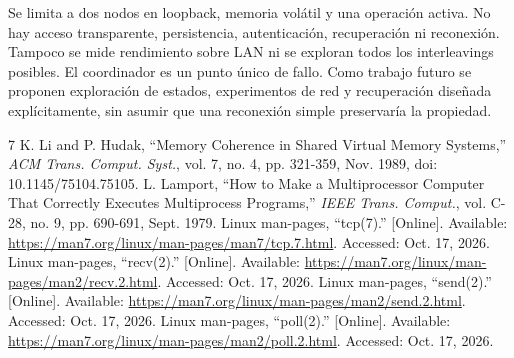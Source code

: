 \documentclass[conference]{IEEEtran}
\begin{document}
Se limita a dos nodos en loopback, memoria volátil y una operación activa. No hay
acceso transparente, persistencia, autenticación, recuperación ni reconexión. Tampoco
se mide rendimiento sobre LAN ni se exploran todos los interleavings posibles. El
coordinador es un punto único de fallo. Como trabajo futuro se proponen exploración
de estados, experimentos de red y recuperación diseñada explícitamente, sin asumir
que una reconexión simple preservaría la propiedad.

\begin{thebibliography}{7}
 K. Li and P. Hudak, ``Memory Coherence in Shared Virtual Memory Systems,''
\emph{ACM Trans. Comput. Syst.}, vol. 7, no. 4, pp. 321-359, Nov. 1989,
doi: 10.1145/75104.75105.
 L. Lamport, ``How to Make a Multiprocessor Computer That Correctly
Executes Multiprocess Programs,'' \emph{IEEE Trans. Comput.}, vol. C-28, no. 9,
pp. 690-691, Sept. 1979.
 Linux man-pages, ``tcp(7).'' [Online]. Available:
\url{https://man7.org/linux/man-pages/man7/tcp.7.html}. Accessed: Oct. 17, 2026.
 Linux man-pages, ``recv(2).'' [Online]. Available:
\url{https://man7.org/linux/man-pages/man2/recv.2.html}. Accessed: Oct. 17, 2026.
 Linux man-pages, ``send(2).'' [Online]. Available:
\url{https://man7.org/linux/man-pages/man2/send.2.html}. Accessed: Oct. 17, 2026.
 Linux man-pages, ``poll(2).'' [Online]. Available:
\url{https://man7.org/linux/man-pages/man2/poll.2.html}. Accessed: Oct. 17, 2026.
\end{thebibliography}
\end{document}
